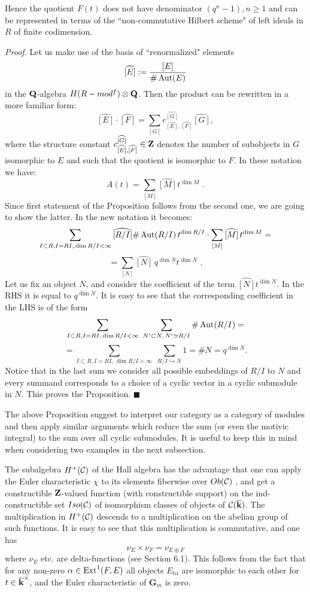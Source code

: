 \documentclass[12pt]{article}
\begin{document}
Hence the quotient $F(t)$ does not have denominator $(q^n-1), n\geqslant 1$ and can be represented in terms of the ``non-commutative Hilbert scheme" of left ideals in $R$ of finite codimension.

{\it Proof.}
Let us make use of the basis of ``renormalized" elements $$\widehat{[E]}:={[E]\over{\#\operatorname{Aut}(E)}}$$ in the ${\bf Q}$-algebra $H(R-mod^f)\otimes {\bf Q}$. Then the product can be rewritten in a more familiar form:
$$\widehat{[E]}\cdot\widehat{[F]} =\sum_{[G]}c_{\widehat{[E]},\widehat{[F]}}^{\widehat{[G]}}\widehat{[G]},$$
where the structure constant $c_{\widehat{[E]},\widehat{[F]}}^{\widehat{[G]}}\in {\bf Z}$ denotes the number of subobjects in $G$ isomorphic to $E$ and such that the quotient
is isomorphic to $F$.
In these notation we have:
$$A(t)=\sum_{[M]}\widehat{[M]}t^{\dim M}\,\,.$$
Since first statement of the Proposition follows from the second one, we are going to show the latter. In the new notation it becomes:
$$\sum_{I\subset R, I=RI, \,\dim R/I<\infty}\widehat{[R/I]}\#\operatorname{Aut}(R/I)\,t^{\dim R/I}\cdot\sum_{[M]}\widehat{[M]}\,t^{\dim M}=$$
$$=\sum_{[N]}\widehat{[N]}\,q^{\dim N}t^{\dim N}\,\,.$$
Let us fix an object $N$, and consider the coefficient of 
the term $\widehat{[N]}t^{\dim N}$. In the RHS it is equal to $q^{\dim N}$.
 It is easy to see that the corresponding coefficient in the LHS is of the form
$$\sum_{I\subset R, I=RI, \,\dim R/I<\infty}\,\,\sum_{N^{\prime}\subset N,\, N^{\prime}\simeq R/I}\#\operatorname{Aut}(R/I)=$$
$$=\sum_{I\subset R, I=RI, \,\dim R/I<\infty}\,\,\sum_{R/I\hookrightarrow N}1=\#N=q^{\dim N}.$$
Notice that in the last sum we consider all possible embeddings of $R/I$ to $N$ and every summand corresponds to a choice of a  cyclic vector in a cyclic submodule in $N$. This proves the Proposition. $\blacksquare$


The above Proposition suggest to interpret our category as a category of modules and then apply  similar arguments which reduce the sum (or even the motivic integral) to the sum over all cyclic submodules. It is useful to keep this in mind when considering two examples in the  next subsection.


\begin{rmk}  The subalgebra $H^+({\mathcal C})$ of the Hall algebra has the advantage that one can apply the Euler characteristic
 $\chi$ to its elements fiberwise over $Ob({\mathcal C})$ , and  get a constructible ${\bf Z}$-valued function (with constructible support) on the ind-constructible
 set $Iso({\mathcal C})$ of isomorphism classes of objects of ${\mathcal C}({\overline{\bf k}})$. The multiplication in $H^+({\mathcal C})$ descends to a multiplication
 on the abelian group of such functions. It is easy to see that this multiplication is commutative, and one has
 $$\nu_E \times \nu_F=\nu_{E\oplus F}$$
where $\nu_E$ etc. are delta-functions (see Section 6.1). This follows from the fact that for any non-zero $\alpha \in \operatorname{Ext}^1(F,E)$
 all objects $E_{t \alpha}$ are isomorphic to each other for $t\in {\overline{\bf k}}^\times$, and the Euler characteristic of ${\mathbf G}_m$ is zero.
\end{rmk}
\end{document}
